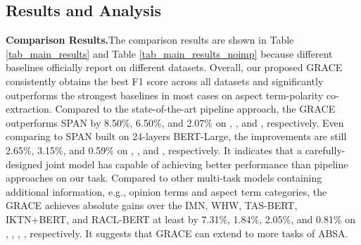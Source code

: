 \documentclass[11pt,a4paper]{article}
\begin{document}
\subsection{Results and Analysis}
\noindent
\textbf{Comparison Results.}\quad The comparison results are shown in Table \ref{tab_main_results} and Table \ref{tab_main_results_noimp} because different baselines officially report on different datasets. Overall, our proposed GRACE consistently obtains the best F1 score across all datasets and significantly outperforms the strongest baselines in most cases on aspect term-polarity co-extraction. Compared to the state-of-the-art pipeline approach, the GRACE outperforms SPAN by 8.50\%, 6.50\%, and 2.07\% on , , and , respectively. Even comparing to SPAN built on 24-layers BERT-Large, the improvements are still 2.65\%, 3.15\%, and 0.59\% on , , and , respectively. It indicates that a carefully-designed joint model has capable of achieving better performance than pipeline approaches on our task. Compared to other multi-task models containing additional information, e.g., opinion terms and aspect term categories, the GRACE achieves absolute gains over the IMN, WHW, TAS-BERT, IKTN+BERT, and RACL-BERT at least by 7.31\%, 1.84\%, 2.05\%, and 0.81\% on , , , , respectively. It suggests that GRACE can extend to more tasks of ABSA.
\end{document}
